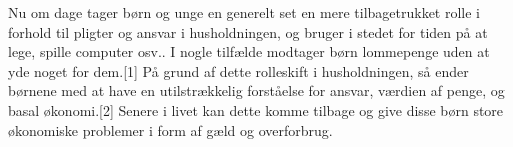 Nu om dage tager børn og unge en generelt set en mere tilbagetrukket rolle i forhold til pligter og ansvar i husholdningen, og bruger i stedet for tiden på at lege, spille computer osv.. I nogle tilfælde modtager børn lommepenge uden at yde noget for dem.[1] På grund af dette rolleskift i husholdningen, så ender børnene med at have en utilstrækkelig forståelse for ansvar, værdien af penge, og basal økonomi.[2] Senere i livet kan dette komme tilbage og give disse børn store økonomiske problemer i form af gæld og overforbrug.